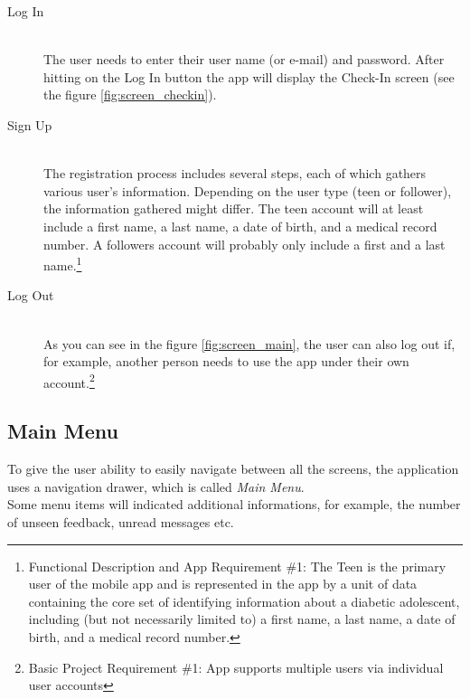 \documentclass{article}
\begin{document}
    \begin{description}
        \item[Log In] \hfill \\
        The user needs to enter their user name (or e-mail) and password. After hitting on the Log In button the app will display the Check-In screen (see the figure \ref{fig:screen_checkin}).
        \item[Sign Up] \hfill \\
            The registration process includes several steps, each of which gathers various user's information. Depending on the user type (teen or follower), the information gathered might differ. The teen account will at least include a first name, a last name, a date of birth, and a medical record number. A followers account will probably only include a first and a last name.\footnote{Functional Description and App Requirement \#1: The Teen is the primary user of the mobile app and is represented in the app by a unit of data containing the core set of identifying information about a diabetic adolescent, including (but not necessarily limited to) a first name, a last name, a date of birth, and a medical record number.}
        \item[Log Out] \hfill \\
        As you can see in the figure \ref{fig:screen_main}, the user can also log out if, for example, another person needs to use the app under their own account.\footnote{Basic Project Requirement \#1: App supports multiple users via individual user accounts}
    \end{description}

    \newpage

    \subsection{Main Menu}

    To give the user ability to easily navigate between all the screens, the application uses a navigation drawer, which is called \emph{Main Menu}.\\Some menu items will indicated additional informations, for example, the number of unseen feedback, unread messages etc.
\end{document}
